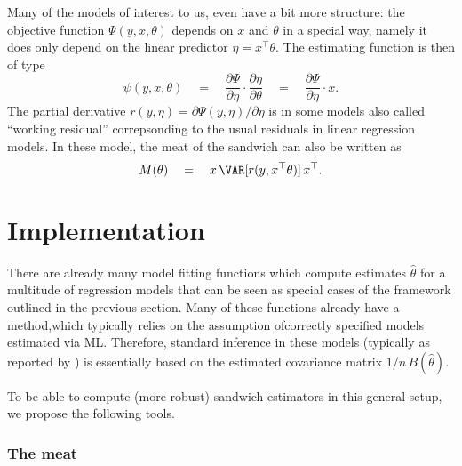 \documentclass{Z}
\begin{document}
Many of the models of interest to us, even have a bit more structure: the objective function
$\Psi(y, x, \theta)$ depends on $x$ and $\theta$ in a special way, namely it does only
depend on the linear predictor $\eta = x^\top \theta$. The estimating function is then of type
\begin{equation}
  \psi(y, x, \theta)
    \quad = \quad \frac{\partial \Psi}{\partial \eta} \cdot \frac{\partial \eta}{\partial \theta}
    \quad = \quad \frac{\partial \Psi}{\partial \eta} \cdot x.
\end{equation}
The partial derivative $r(y, \eta) = \partial \Psi(y, \eta) / \partial \eta$ is in some models
also called ``working residual'' correpsonding to the usual residuals in linear regression models.
In these model, the meat of the sandwich can also be written as
\begin{equation} \label{eq:meatHC}
  M(\theta) \quad = \quad x \, \VAR[ r(y, x^\top \theta) ] \, x^\top.
\end{equation}



\section{Implementation}

There are already many model fitting functions which compute estimates $\hat \theta$
for a multitude of regression models that can be seen as special cases of the framework
outlined in the previous section. Many of these functions already have a 
method,which typically relies on the assumption ofcorrectly specified models estimated
via ML. Therefore, standard inference
in these models (typically as reported by ) is essentially based on the estimated
covariance matrix $1/n \, B(\hat \theta)$.

To be able to compute (more robust) sandwich estimators in this general setup, we
propose the following tools. 

\subsubsection*{The meat}
\end{document}
